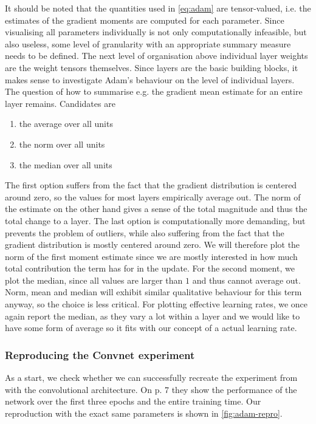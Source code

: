 It should be noted that the quantities used in \cref{eq:adam} are tensor-valued,
i.e. the estimates of the gradient moments are computed for each parameter.
Since visualising all parameters individually is not only computationally
infeasible, but also useless, some level of granularity with an appropriate
summary measure needs to be defined. The next level of organisation above
individual layer weights are the weight tensors themselves. Since layers are the
basic building blocks, it makes sense to investigate Adam's behaviour on the
level of individual layers. The question of how to summarise e.g. the gradient
mean estimate for an entire layer remains. Candidates are
\begin{enumerate}
    \item the average over all units
    \item the norm over all units
    \item the median over all units
\end{enumerate}
The first option suffers from the fact that the gradient distribution is
centered around zero, so the values for most layers empirically average out.
The norm of the estimate on the other hand gives a sense of the total magnitude and thus the total
change to a layer. The last option is computationally more demanding, but
prevents the problem of outliers, while also suffering from the fact that the
gradient distribution is mostly centered around zero. We will therefore plot the
norm of the first moment estimate since we are mostly interested in how much
total contribution the term has for in the update. For the second moment, we
plot the median, since all values are larger than $1$ and thus cannot average
out. Norm, mean and median will exhibit similar qualitative behaviour for this
term anyway, so the choice is less critical. For plotting effective learning
rates, we once again report the median, as they vary a lot within a layer and we
would like to have some form of average so it fits with our concept of a
actual learning rate.

\subsubsection{Reproducing the Convnet experiment}

As a start, we check whether we can successfully recreate the experiment from
\citep{kingma2014adam} with the convolutional architecture. On p. 7 they show
the performance of the network over the first three epochs and the entire
training time. Our reproduction with the exact same parameters  is shown in
\cref{fig:adam-repro}.

